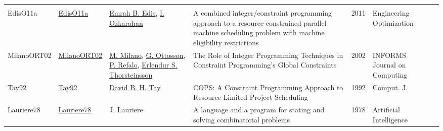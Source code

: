 {\begin{longtable}{p{2cm}p{2cm}p{5cm}p{10cm}rp{3cm}l}
\cite{ZarandiB12}\\EdisO11a & \href{http://dx.doi.org/10.1080/03052151003759117}{EdisO11a} & \hyperref[auth:a352]{Emrah B. Edis}, \hyperref[auth:a354]{I. Ozkarahan} & A combined integer/constraint programming approach to a resource-constrained parallel machine scheduling problem with machine eligibility restrictions & 2011 & Engineering Optimization & \cite{EdisO11a}\\MilanoORT02 & \href{http://dx.doi.org/10.1287/ijoc.14.4.387.2830}{MilanoORT02} & \hyperref[auth:a144]{M. Milano}, \hyperref[auth:a860]{G. Ottosson}, \hyperref[auth:a257]{P. Refalo}, \hyperref[auth:a882]{Erlendur S. Thorsteinsson} & The Role of Integer Programming Techniques in Constraint Programming's Global Constraints & 2002 & INFORMS Journal on Computing & \cite{MilanoORT02}\\Tay92 & \href{}{Tay92} & \hyperref[auth:a710]{David B. H. Tay} & {COPS:} {A} Constraint Programming Approach to Resource-Limited Project Scheduling & 1992 & Comput. J. & \cite{Tay92}\\Lauriere78 & \href{http://dx.doi.org/10.1016/0004-3702(78)90029-2}{Lauriere78} & J. Lauriere & A language and a program for stating and solving combinatorial problems & 1978 & Artificial Intelligence & \cite{Lauriere78}\\\end{longtable}
}

